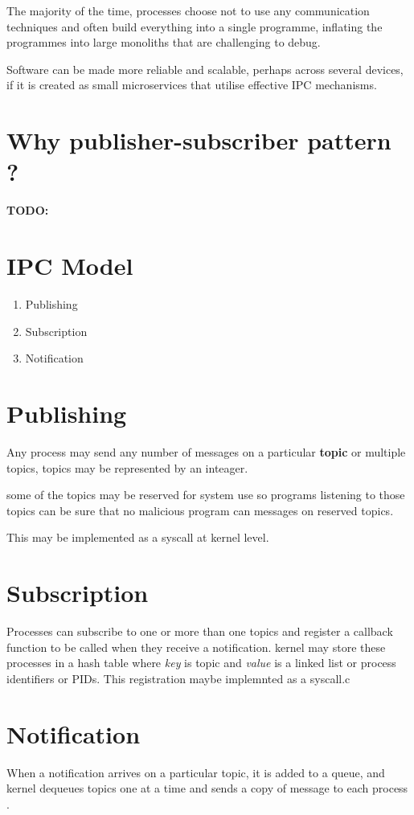 \documentclass[12pt]{report}
\begin{document}
	The majority of the time, processes choose not to use any communication techniques 
	and often build everything into a single programme, inflating the programmes 
	into large monoliths that are challenging to debug.
	
	Software can be made more reliable and scalable, perhaps across several devices, 
	if it is created as small microservices that utilise effective IPC mechanisms.
	
	\section{Why publisher-subscriber pattern ?}
	
	\textbf{TODO:}
	
	\section{IPC Model}
	\begin{enumerate}
		\item Publishing
		\item Subscription
		\item Notification
	\end{enumerate}
	
	\section{Publishing}
	Any process may send any number of messages on a particular \textbf{topic} or 
	multiple topics, topics may be represented by an inteager.

	some of the topics may be reserved for system use so programs listening to those
	topics can be sure that no malicious program can messages on reserved topics.
	
	This may be implemented as a syscall at kernel level.
				 	
	\section{Subscription}
	Processes can subscribe to one or more than one topics and register a callback
	function to be called when they receive a notification.
	kernel may store these processes in a hash table where \textit{key} is topic 
	and \textit{value} is a linked list or process identifiers or PIDs.
	This registration maybe implemnted as a syscall.c
		
	\section{Notification}
	When a notification arrives on a particular topic, it is added to a queue,
	and kernel dequeues topics one at a time and sends a copy of message to each 
	process \cite{citation04}.
	
\end{document}
